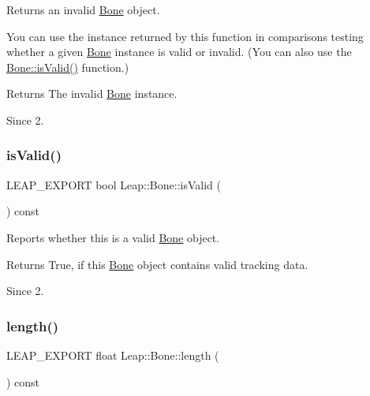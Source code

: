 Returns an invalid \hyperlink{class_leap_1_1_bone}{Bone} object.

You can use the instance returned by this function in comparisons testing whether a given \hyperlink{class_leap_1_1_bone}{Bone} instance is valid or invalid. (You can also use the \hyperlink{class_leap_1_1_bone_a82b71f671aedac1eb3cf5ff4e762e963}{Bone\+::is\+Valid()} function.)


\begin{DoxyCodeInclude}
\end{DoxyCodeInclude}


\begin{DoxyReturn}{Returns}
The invalid \hyperlink{class_leap_1_1_bone}{Bone} instance. 
\end{DoxyReturn}
\begin{DoxySince}{Since}
2. 
\end{DoxySince}
\mbox{\label{class_leap_1_1_bone_a82b71f671aedac1eb3cf5ff4e762e963}} 
\subsubsection{\texorpdfstring{is\+Valid()}{isValid()}}
{\footnotesize\ttfamily L\+E\+A\+P\+\_\+\+E\+X\+P\+O\+RT bool Leap\+::\+Bone\+::is\+Valid (\begin{DoxyParamCaption}{ }\end{DoxyParamCaption}) const}

Reports whether this is a valid \hyperlink{class_leap_1_1_bone}{Bone} object.


\begin{DoxyCodeInclude}
\end{DoxyCodeInclude}


\begin{DoxyReturn}{Returns}
True, if this \hyperlink{class_leap_1_1_bone}{Bone} object contains valid tracking data. 
\end{DoxyReturn}
\begin{DoxySince}{Since}
2. 
\end{DoxySince}
\mbox{\label{class_leap_1_1_bone_abc4a685582203d7dfed0b13e0cf7f117}} 
\subsubsection{\texorpdfstring{length()}{length()}}
{\footnotesize\ttfamily L\+E\+A\+P\+\_\+\+E\+X\+P\+O\+RT float Leap\+::\+Bone\+::length (\begin{DoxyParamCaption}{ }\end{DoxyParamCaption}) const}

